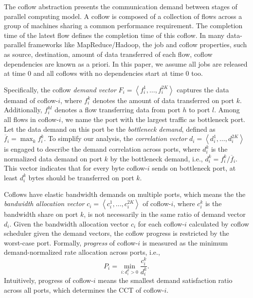 \documentclass[10pt, conference, letterpaper]{IEEEtran}
\begin{document}
The coflow abstraction presents the communication demand between stages of parallel computing model. A coflow is composed of a collection of flows across a group of machines sharing a common performance requirement. The completion time of the latest flow defines the completion time of this coflow. In many data-parallel frameworks like MapReduce/Hadoop, the job and coflow properties, such as source, destination, amount of data transferred of each flow, coflow dependencies are known as a priori\cite{varys, aalo, bingchuan}. In this paper, we assume all jobs are released at time 0 and all coflows with no dependencies start at time 0 too.

Specifically, the coflow \emph{demand vector} $F_i = \left\langle f_i^1,\dots,f_i^{2K}\right\rangle$ captures the data demand of coflow-$i$, where $f_i^k$ denotes the amount of data transferred on port $k$. Additionally, $f_i^{hl}$ denotes a flow transferring data from port $h$ to port $l$. Among all flows in coflow-$i$, we name the port with the largest traffic as bottleneck port. Let the data demand on this port be the \emph{bottleneck demand}, defined as $\overline{f}_i=\max_{k} f_i^k$. To simplify our analysis, the \emph{correlation vector} $d_i = \left\langle d_i^1,\dots,d_i^{2K}\right\rangle$ is engaged to describe the demand correlation across ports, where $d_i^k$ is the normalized data demand on port $k$ by the bottleneck demand, i.e., $d_i^k = f_i^k/\overline{f}_i$. This vector indicates that for every byte coflow-$i$ sends on bottleneck port, at least $d_i^k$ bytes should be transferred on port $k$.
 
Coflows have elastic bandwidth demands on multiple ports, which means the the \emph{bandwidth allocation vector} $c_i=\left\langle c_i^1,\dots,c_i^{2K}\right\rangle$ of coflow-$i$, where $c_i^k$ is the bandwidth share on port $k$, is not necessarily in the same ratio of demand vector $d_i$. Given the bandwidth allocation vector $c_i$ for each coflow-$i$ calculated by coflow scheduler given the demand vectors, the coflow progress is restricted by the worst-case port. Formally, \emph{progress} of coflow-$i$ is measured as the minimum demand-normalized rate allocation across ports, i.e.,
 \begin{equation}
 	P_i = \min\limits_{i:d_i^k>0}\frac{c_i^k}{d_i^k}.
 \end{equation}
 Intuitively, progress of coflow-$i$ means the smallest demand satisfaction ratio across all ports, which determines the CCT of coflow-$i$.
 
\end{document}
